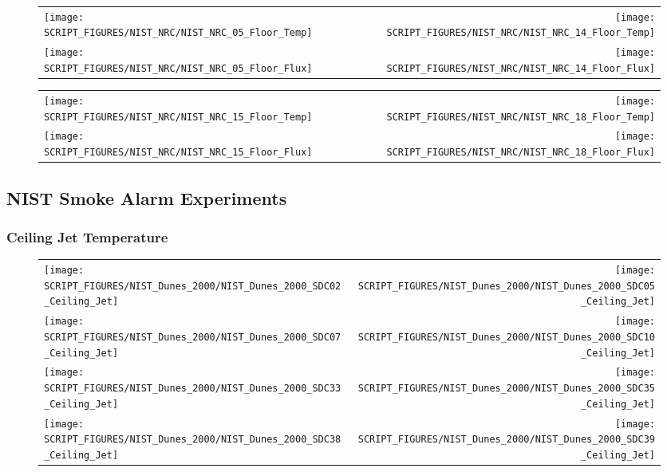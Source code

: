 \begin{figure}[!ht]
\begin{tabular*}{\textwidth}{l@{\extracolsep{\fill}}r}
\texttt{[image: SCRIPT\_FIGURES/NIST\_NRC/NIST\_NRC\_05\_Floor\_Temp]} &
\texttt{[image: SCRIPT\_FIGURES/NIST\_NRC/NIST\_NRC\_14\_Floor\_Temp]} \\
\texttt{[image: SCRIPT\_FIGURES/NIST\_NRC/NIST\_NRC\_05\_Floor\_Flux]} &
\texttt{[image: SCRIPT\_FIGURES/NIST\_NRC/NIST\_NRC\_14\_Floor\_Flux]}
\end{tabular*}
\label{NIST_NRC_Floor_5_and_14}
\end{figure}

\clearpage

\begin{figure}[!ht]
\begin{tabular*}{\textwidth}{l@{\extracolsep{\fill}}r}
\texttt{[image: SCRIPT\_FIGURES/NIST\_NRC/NIST\_NRC\_15\_Floor\_Temp]} &
\texttt{[image: SCRIPT\_FIGURES/NIST\_NRC/NIST\_NRC\_18\_Floor\_Temp]} \\
\texttt{[image: SCRIPT\_FIGURES/NIST\_NRC/NIST\_NRC\_15\_Floor\_Flux]} &
\texttt{[image: SCRIPT\_FIGURES/NIST\_NRC/NIST\_NRC\_18\_Floor\_Flux]}
\end{tabular*}
\label{NIST_NRC_Floor_15_and_18}
\end{figure}

\clearpage

\subsection{NIST Smoke Alarm Experiments}

\subsubsection{Ceiling Jet Temperature}

\begin{figure}[h!]
\begin{tabular*}{\textwidth}{l@{\extracolsep{\fill}}r}
\texttt{[image: SCRIPT\_FIGURES/NIST\_Dunes\_2000/NIST\_Dunes\_2000\_SDC02\_Ceiling\_Jet]} &
\texttt{[image: SCRIPT\_FIGURES/NIST\_Dunes\_2000/NIST\_Dunes\_2000\_SDC05\_Ceiling\_Jet]} \\
\texttt{[image: SCRIPT\_FIGURES/NIST\_Dunes\_2000/NIST\_Dunes\_2000\_SDC07\_Ceiling\_Jet]} &
\texttt{[image: SCRIPT\_FIGURES/NIST\_Dunes\_2000/NIST\_Dunes\_2000\_SDC10\_Ceiling\_Jet]} \\
\texttt{[image: SCRIPT\_FIGURES/NIST\_Dunes\_2000/NIST\_Dunes\_2000\_SDC33\_Ceiling\_Jet]} &
\texttt{[image: SCRIPT\_FIGURES/NIST\_Dunes\_2000/NIST\_Dunes\_2000\_SDC35\_Ceiling\_Jet]} \\
\texttt{[image: SCRIPT\_FIGURES/NIST\_Dunes\_2000/NIST\_Dunes\_2000\_SDC38\_Ceiling\_Jet]} &
\texttt{[image: SCRIPT\_FIGURES/NIST\_Dunes\_2000/NIST\_Dunes\_2000\_SDC39\_Ceiling\_Jet]}
\end{tabular*}
\label{NIST_Dunes_2000_Ceiling_Jet}
\end{figure}


